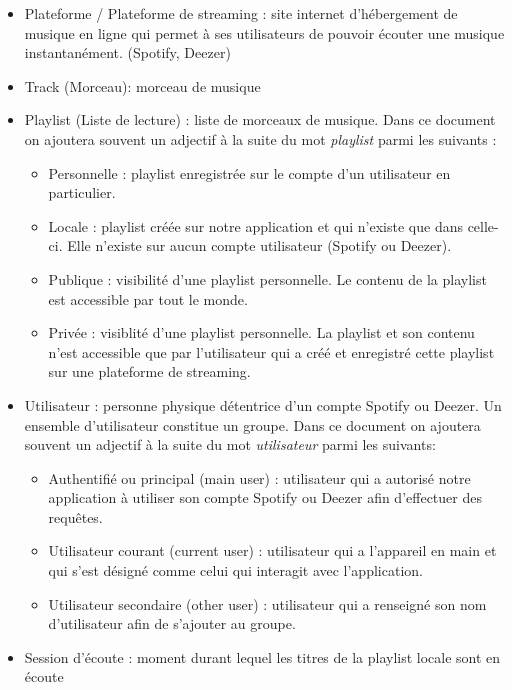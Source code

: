 \documentclass{article}
\begin{document}
		\begin{itemize}
		    \item Plateforme / Plateforme de streaming : site internet d’hébergement de musique en ligne qui permet à ses utilisateurs de pouvoir écouter une musique instantanément. (Spotify, Deezer)
			\item Track (Morceau): morceau de musique
			\item Playlist (Liste de lecture) : liste de morceaux de musique. Dans ce document on ajoutera souvent un adjectif à la suite du mot \textit{playlist} parmi les suivants : 
			      \begin{itemize}
			      	\item Personnelle : playlist enregistrée sur le compte d'un utilisateur en particulier.
			      	\item Locale : playlist créée sur notre application et qui n'existe que dans celle-ci. Elle n'existe sur aucun compte utilisateur (Spotify ou Deezer).
			      	\item Publique : visibilité d'une playlist personnelle. Le contenu de la playlist est accessible par tout le monde.
			      	\item Privée : visiblité d'une playlist personnelle. La playlist et son contenu n'est accessible que par l'utilisateur qui a créé et enregistré cette playlist sur une plateforme de streaming.
			      \end{itemize}
			\item Utilisateur : personne physique détentrice d'un compte Spotify ou Deezer. Un ensemble d'utilisateur constitue un groupe.\newline
			Dans ce document on ajoutera souvent un adjectif à la suite du mot \textit{utilisateur} parmi les suivants:
			      \begin{itemize}
			      	\item Authentifié ou principal (main user) : utilisateur qui a autorisé notre application à utiliser son compte Spotify ou Deezer afin d'effectuer des requêtes.
			      	\item Utilisateur courant (current user) : utilisateur qui a l'appareil en main et qui s'est désigné comme celui qui interagit avec l'application.
			      	\item Utilisateur secondaire (other user) : utilisateur qui a renseigné son nom d'utilisateur afin de s'ajouter au groupe.
			      \end{itemize}
			\item Session d'écoute : moment durant lequel les titres de la playlist locale sont en écoute
		\end{itemize}
		
\end{document}
